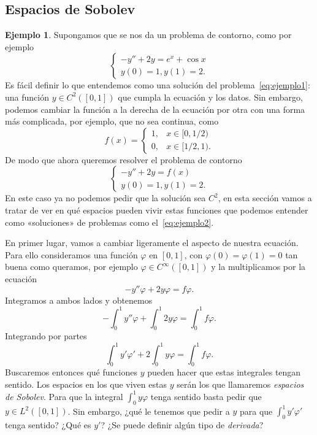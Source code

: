 \documentclass[12pt,a4paper]{article}
\theoremstyle{definition} \newtheorem{defn}[thm]{Definición}
\theoremstyle{definition} \newtheorem{ejemplo}[thm]{Ejemplo}
\theoremstyle{definition} \newtheorem{ejercicio}[thm]{Ejercicio}
\theoremstyle{remark} \newtheorem*{obs}{Observación}
\begin{document}
 \subsection{Espacios de Sobolev}
\begin{ejemplo}\label{ejemplo1}
  Supongamos que se nos da un problema de contorno, como por ejemplo
  \begin{equation}
    \begin{cases}
      -y''+2y=e^x+\cos x \\
      y(0)=1, y(1)=2.
    \end{cases}
    \label{eq:ejemplo1}
  \end{equation}
  Es fácil definir lo que entendemos como una solución del problema~\eqref{eq:ejemplo1}: una función $y\in C^2([0,1])$ que cumpla la ecuación y los datos. Sin embargo, podemos cambiar la función a la derecha de la ecuación por otra con una forma más complicada, por ejemplo, que no sea continua, como
  \begin{equation*}
    f(x)=
    \begin{cases}
      1, & x \in [0,1/2) \\
      0, & x \in [1/2,1).
    \end{cases}
  \end{equation*}
  De modo que ahora queremos resolver el problema de contorno
  \begin{equation}
    \begin{cases}
      -y''+2y=f(x) \\
      y(0)=1, y(1)=2.
    \end{cases}
    \label{eq:ejemplo2}
  \end{equation}
  En este caso ya no podemos pedir que la solución sea $C^2$, en esta sección vamos a tratar de ver en qué espacios pueden vivir estas funciones que podemos entender como «soluciones» de problemas como el~\eqref{eq:ejemplo2}. 

  En primer lugar, vamos a cambiar ligeramente el aspecto de nuestra ecuación. Para ello consideramos una función $\varphi$ en $[0,1]$, con $\varphi(0)=\varphi(1)=0$ tan buena como queramos, por ejemplo $\varphi\in C^{\infty}([0,1])$ y la multiplicamos por la ecuación
  \begin{equation*}
    -y''\varphi + 2y \varphi = f \varphi.
  \end{equation*}
  Integramos a ambos lados y obtenemos
  \begin{equation*}
    -\int_0^1 y'' \varphi + \int_0^1 2y \varphi = \int_0^1 f \varphi.
  \end{equation*}
  Integrando por partes
  \begin{equation*}
    \int_0^1 y' \varphi' + 2 \int_0^1 y \varphi = \int_0^1 f \varphi.
  \end{equation*}
  Buscaremos entonces qué funciones $y$ pueden hacer que estas integrales tengan sentido. Los espacios en los que viven estas $y$ serán los que llamaremos \emph{espacios de Sobolev}. 
  Para que la integral $\int_0^1 y \varphi$ tenga sentido basta pedir que $y\in L^2([0,1])$. Sin embargo, ¿qué le tenemos que pedir a $y$ para que $\int_0^1 y'\varphi'$ tenga sentido? ¿Qué es $y'$? ¿Se puede definir algún tipo de \emph{derivada}?


\end{ejemplo}
\end{document}
